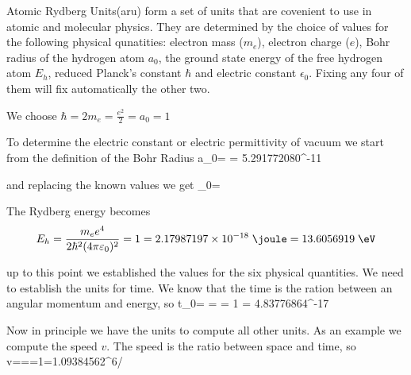 \par{Atomic Rydberg Units(aru) form a set of units that are covenient to use in atomic and molecular physics. They are determined by the choice of values for the following physical qunatities: electron mass ($m_e$), electron charge ($e$), Bohr radius of the hydrogen atom $a_0$, the ground state energy of the free hydrogen atom $E_h$, reduced Planck's constant $\hbar$ and electric constant $\epsilon_0$. Fixing any four of them will fix automatically the other two.}
\par{We choose $\hbar=2m_e=\frac{e^2}{2}=a_0=1$}
\par{To determine the electric constant or electric permittivity of vacuum we start from the definition of the Bohr Radius}
\be
a_0= = 5.291772080^{-11}\;\metre
\ee
\par{and replacing the known values we get}
\be
\varepsilon_0=
\ee
\par{The Rydberg energy becomes}
\begin{equation}
E_h=\frac{m_ee^4}{2\hbar^2(4\pi\varepsilon_0)^2} = 1 = 2.17987197\times10^{-18}\;\joule = 13.6056919\;\eV
\end{equation}
\par{up to this point we established the values for the six physical quantities. We need to establish the units for time. We know that the time is the ration between an angular momentum and energy, so}
\be
t_0= =  = 1 = 4.83776864^{-17}\;\second
\ee
\par{Now in principle we have the units to compute all other units. As an example we compute the speed $v$. The speed is the ratio between space and time, so}
\be
v===1=1.09384562^{6}\;\metre/\second
\ee

